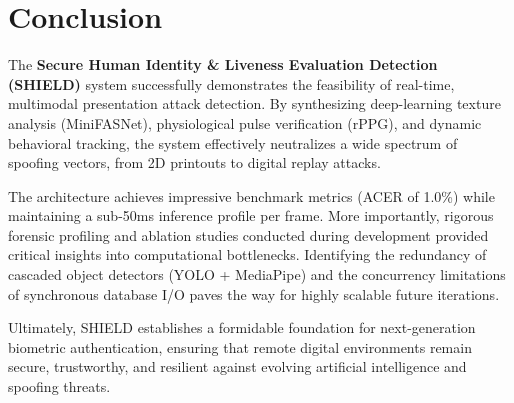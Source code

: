 \documentclass[12pt, a4paper]{report}
\begin{document}
\chapter{Conclusion}
The \textbf{Secure Human Identity \& Liveness Evaluation Detection (SHIELD)} system successfully demonstrates the feasibility of real-time, multimodal presentation attack detection. By synthesizing deep-learning texture analysis (MiniFASNet), physiological pulse verification (rPPG), and dynamic behavioral tracking, the system effectively neutralizes a wide spectrum of spoofing vectors, from 2D printouts to digital replay attacks. 

The architecture achieves impressive benchmark metrics (ACER of 1.0\%) while maintaining a sub-50ms inference profile per frame. More importantly, rigorous forensic profiling and ablation studies conducted during development provided critical insights into computational bottlenecks. Identifying the redundancy of cascaded object detectors (YOLO + MediaPipe) and the concurrency limitations of synchronous database I/O paves the way for highly scalable future iterations.

Ultimately, SHIELD establishes a formidable foundation for next-generation biometric authentication, ensuring that remote digital environments remain secure, trustworthy, and resilient against evolving artificial intelligence and spoofing threats.
\end{document}

